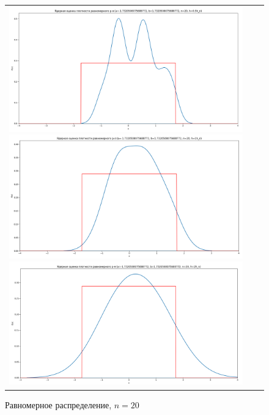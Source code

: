\begin{figure}[H]
	\begin{tabular}{ccc}
		\includegraphics[scale=0.14]{resources/4_uniform_20_half.png}
		\includegraphics[scale=0.14]{resources/4_uniform_20_one.png}
		\includegraphics[scale=0.14]{resources/4_uniform_20_two.png}
	\end{tabular}
	\caption{Равномерное распределение, $n=20$}
\end{figure}

